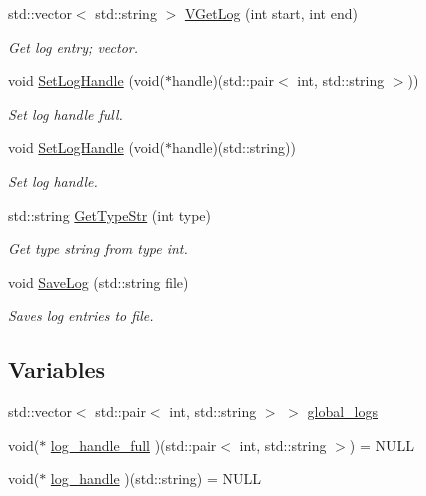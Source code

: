 \begin{DoxyCompactItemize}
std\+::vector$<$ std\+::string $>$ \hyperlink{namespacepessum_a82047101ac6c52e881b2817c487038ff}{V\+Get\+Log} (int start, int end)
\begin{DoxyCompactList}\small\item\em Get log entry; vector. \end{DoxyCompactList}\item 
void \hyperlink{namespacepessum_a587b50496dee1a27cbfe99025bc15656}{Set\+Log\+Handle} (void($\ast$handle)(std\+::pair$<$ int, std\+::string $>$))
\begin{DoxyCompactList}\small\item\em Set log handle full. \end{DoxyCompactList}\item 
void \hyperlink{namespacepessum_ab20026ac5dd6e6014097f8792679a2df}{Set\+Log\+Handle} (void($\ast$handle)(std\+::string))
\begin{DoxyCompactList}\small\item\em Set log handle. \end{DoxyCompactList}\item 
std\+::string \hyperlink{namespacepessum_a7a72cd1ada7b9736ebd7914ad5a9eedf}{Get\+Type\+Str} (int type)
\begin{DoxyCompactList}\small\item\em Get type string from type int. \end{DoxyCompactList}\item 
void \hyperlink{namespacepessum_a73443b520f83c0a1898a1e8566f03e91}{Save\+Log} (std\+::string file)
\begin{DoxyCompactList}\small\item\em Saves log entries to file. \end{DoxyCompactList}\end{DoxyCompactItemize}
\subsection*{Variables}
\begin{DoxyCompactItemize}
\item 
std\+::vector$<$ std\+::pair$<$ int, std\+::string $>$ $>$ \hyperlink{namespacepessum_af89cb9c0ecf053bd93b6cfadf606b350}{global\+\_\+logs}
\item 
void($\ast$ \hyperlink{namespacepessum_abf1b472e1b61a337c584d96eb9789f8e}{log\+\_\+handle\+\_\+full} )(std\+::pair$<$ int, std\+::string $>$) = N\+U\+LL
\item 
void($\ast$ \hyperlink{namespacepessum_af96bc8aacecc5a8145c0df704b5f9b54}{log\+\_\+handle} )(std\+::string) = N\+U\+LL
\end{DoxyCompactItemize}


